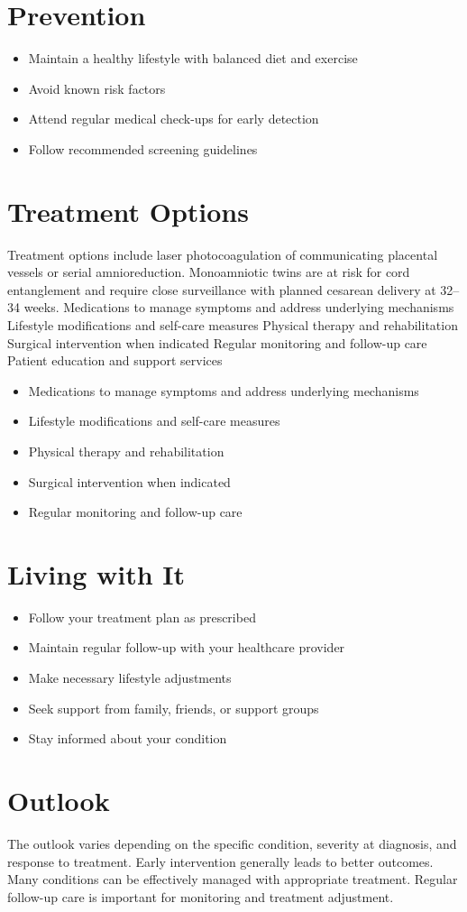 \section{Prevention}
\begin{itemize}[noitemsep]
  \item Maintain a healthy lifestyle with balanced diet and exercise
  \item Avoid known risk factors
  \item Attend regular medical check-ups for early detection
  \item Follow recommended screening guidelines
\end{itemize}
\section{Treatment Options}
Treatment options include laser photocoagulation of communicating placental vessels or serial amnioreduction. Monoamniotic twins are at risk for cord entanglement and require close surveillance with planned cesarean delivery at 32--34 weeks. Medications to manage symptoms and address underlying mechanisms Lifestyle modifications and self-care measures Physical therapy and rehabilitation Surgical intervention when indicated Regular monitoring and follow-up care Patient education and support services

\begin{itemize}[noitemsep]
  \item Medications to manage symptoms and address underlying mechanisms
  \item Lifestyle modifications and self-care measures
  \item Physical therapy and rehabilitation
  \item Surgical intervention when indicated
  \item Regular monitoring and follow-up care
\end{itemize}
\section{Living with It}
\begin{itemize}[noitemsep]
  \item Follow your treatment plan as prescribed
  \item Maintain regular follow-up with your healthcare provider
  \item Make necessary lifestyle adjustments
  \item Seek support from family, friends, or support groups
  \item Stay informed about your condition
\end{itemize}
\section{Outlook}
The outlook varies depending on the specific condition, severity at diagnosis, and response to treatment. Early intervention generally leads to better outcomes. Many conditions can be effectively managed with appropriate treatment. Regular follow-up care is important for monitoring and treatment adjustment.
